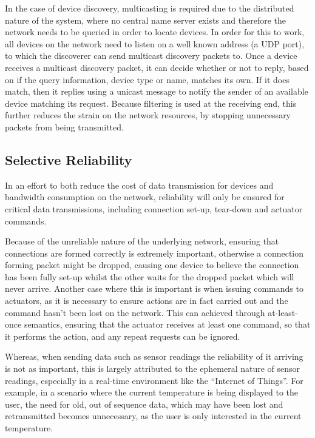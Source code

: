 In the case of device discovery, multicasting is required due to the distributed nature of the system, where no central name server exists and therefore the network needs to be queried in order to locate devices. In order for this to work, all devices on the network need to listen on a well known address (a UDP port), to which the discoverer can send multicast discovery packets to.
Once a device receives a multicast discovery packet, it can decide whether or not to reply, based on if the query information, device type or name, matches its own. If it does match, then it replies using a unicast message to notify the sender of an available device matching its request. Because filtering is used at the receiving end, this further reduces the strain on the network resources, by stopping unnecessary packets from being transmitted.   

\subsection{Selective Reliability} %
\label{sub:selective_reliability}
In an effort to both reduce the cost of data transmission for devices and bandwidth consumption on the network, reliability will only be ensured for critical data transmissions, including connection set-up, tear-down and actuator commands.

Because of the unreliable nature of the underlying network, ensuring that connections are formed correctly is extremely important, otherwise a connection forming packet might be dropped, causing one device to believe the connection has been fully set-up whilst the other waits for the dropped packet which will never arrive. 
Another case where this is important is when issuing commands to actuators, as it is necessary to ensure actions are in fact carried out and the command hasn't been lost on the network. This can achieved through at-least-once semantics, ensuring that the actuator receives at least one command, so that it performs the action, and any repeat requests can be ignored.

Whereas, when sending data such as sensor readings the reliability of it arriving is not as important, this is largely attributed to the ephemeral nature of sensor readings, especially in a real-time environment like the ``Internet of Things''. For example, in a scenario where the current temperature is being displayed to the user, the need for old, out of sequence data, which may have been lost and retransmitted becomes unnecessary, as the user is only interested in the current temperature.


